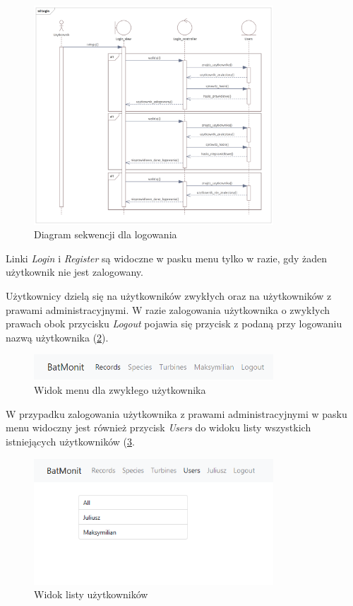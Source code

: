 \documentclass{sprz}
\begin{document}
\begin{figure}[h]
  \centering
  \includegraphics[width=0.8\textwidth]{sprz/sequence_login}
  \caption{Diagram sekwencji dla logowania}
  \label{img:sequence_login}
\end{figure}

Linki \textit{Login} i \textit{Register} są widoczne w pasku menu tylko w razie, gdy żaden użytkownik nie jest zalogowany.

Użytkownicy dzielą się na użytkowników zwykłych oraz na użytkowników z prawami administracyjnymi. W razie zalogowania użytkownika o zwykłych prawach obok przycisku \textit{Logout} pojawia się przycisk z podaną przy logowaniu nazwą użytkownika (\ref{img:app_menu_regular_user}).

\begin{figure}[h]
  \centering
  \includegraphics[width=0.8\textwidth]{sprz/app_menu_regular_user}
  \caption{Widok menu dla zwykłego użytkownika}
  \label{img:app_menu_regular_user}
\end{figure}

W przypadku zalogowania użytkownika z prawami administracyjnymi w pasku menu widoczny jest również przycisk \textit{Users} do widoku listy wszystkich istniejących użytkowników (\ref{img:app_users}.

\begin{figure}[h]
  \centering
  \includegraphics[width=0.8\textwidth]{sprz/app_users}
  \caption{Widok listy użytkowników}
  \label{img:app_users}
\end{figure}
\end{document}
